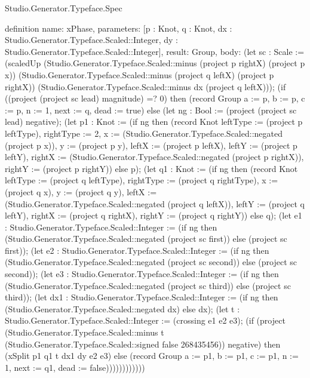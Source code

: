 \begin{lexlean}{Studio.Generator.Typeface.Spec}
\begin{semanticmodule}
definition{
  name: xPhase,
  parameters: [p : Knot, q : Knot, dx : Studio.Generator.Typeface.Scaled::Integer, dy : Studio.Generator.Typeface.Scaled::Integer],
  result: Group,
  body: (let sc : Scale := (scaledUp (Studio.Generator.Typeface.Scaled::minus (project p rightX) (project p x)) (Studio.Generator.Typeface.Scaled::minus (project q leftX) (project p rightX)) (Studio.Generator.Typeface.Scaled::minus dx (project q leftX))); (if ((project (project sc lead) magnitude) =? 0) then (record Group {a := p, b := p, c := p, n := 1, next := q, dead := true}) else (let ng : Bool := (project (project sc lead) negative); (let p1 : Knot := (if ng then (record Knot {leftType := (project p leftType), rightType := 2, x := (Studio.Generator.Typeface.Scaled::negated (project p x)), y := (project p y), leftX := (project p leftX), leftY := (project p leftY), rightX := (Studio.Generator.Typeface.Scaled::negated (project p rightX)), rightY := (project p rightY)}) else p); (let q1 : Knot := (if ng then (record Knot {leftType := (project q leftType), rightType := (project q rightType), x := (project q x), y := (project q y), leftX := (Studio.Generator.Typeface.Scaled::negated (project q leftX)), leftY := (project q leftY), rightX := (project q rightX), rightY := (project q rightY)}) else q); (let e1 : Studio.Generator.Typeface.Scaled::Integer := (if ng then (Studio.Generator.Typeface.Scaled::negated (project sc first)) else (project sc first)); (let e2 : Studio.Generator.Typeface.Scaled::Integer := (if ng then (Studio.Generator.Typeface.Scaled::negated (project sc second)) else (project sc second)); (let e3 : Studio.Generator.Typeface.Scaled::Integer := (if ng then (Studio.Generator.Typeface.Scaled::negated (project sc third)) else (project sc third)); (let dx1 : Studio.Generator.Typeface.Scaled::Integer := (if ng then (Studio.Generator.Typeface.Scaled::negated dx) else dx); (let t : Studio.Generator.Typeface.Scaled::Integer := (crossing e1 e2 e3); (if (project (Studio.Generator.Typeface.Scaled::minus t (Studio.Generator.Typeface.Scaled::signed false 268435456)) negative) then (xSplit p1 q1 t dx1 dy e2 e3) else (record Group {a := p1, b := p1, c := p1, n := 1, next := q1, dead := false}))))))))))))
}


\end{semanticmodule}
\end{lexlean}

